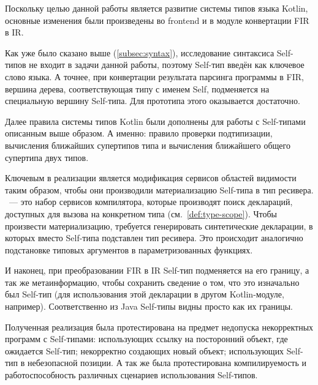 Поскольку целью данной работы является развитие системы типов языка Kotlin, основные изменения были произведены во frontend и в модуле конвертации FIR в IR.

Как уже было сказано выше (\ref{subsec:syntax}), исследование синтаксиса Self-типов не входит в задачи данной работы, поэтому Self-тип введён как ключевое слово языка.
А точнее, при конвертации результата парсинга программы в FIR, вершина дерева, соответствующая типу с именем Self, подменяется на специальную вершину Self-типа.
Для прототипа этого оказывается достаточно.

Далее правила системы типов Kotlin были дополнены для работы с Self-типами описанным выше образом.
А именно: правило проверки подтипизации, вычисления ближайших супертипов типа и вычисления ближайшего общего супертипа двух типов.

Ключевым в реализации является модификация сервисов областей видимости таким образом, чтобы они производили материализацию Self-типа в тип ресивера.
~--- это набор сервисов компилятора, которые производят поиск деклараций, доступных для вызова на конкретном типа (см.~\ref{def:type-scope}).
Чтобы произвести материализацию, требуется генерировать синтетические декларации, в которых вместо Self-типа подставлен тип ресивера.
Это происходит аналогично подстановке типовых аргументов в параметризованных функциях.

И наконец, при преобразовании FIR в IR Self-тип подменяется на его границу, а так же метаинформацию, чтобы сохранить сведение о том, что это изначально был Self-тип (для использования этой декларации в другом Kotlin-модуле, например).
Соответственно из Java Self-типы видны просто как их границы.

Полученная реализация была протестирована на предмет недопуска некорректных программ с Self-типами: использующих ссылку на посторонний объект, где ожидается Self-тип; некорректно создающих новый объект; использующих Self-тип в небезопасной позиции.
А так же была протестирована компилируемость и работоспособность различных сценариев использования Self-типов.
